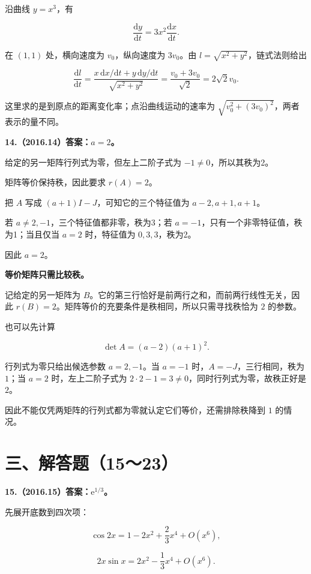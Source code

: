 \documentclass[UTF8,11pt,fontset=windows]{ctexart}
\begin{document}
沿曲线 $y=x^3$，有

$$
\frac{\mathrm dy}{\mathrm dt}=3x^2\frac{\mathrm dx}{\mathrm dt}.
$$

在 $(1,1)$ 处，横向速度为 $v_0$，纵向速度为 $3v_0$。由 $l=\sqrt{x^2+y^2}$，链式法则给出

$$
\frac{\mathrm dl}{\mathrm dt}
=\frac{x\,\mathrm dx/\mathrm dt+y\,\mathrm dy/\mathrm dt}{\sqrt{x^2+y^2}}
=\frac{v_0+3v_0}{\sqrt2}=2\sqrt2v_0.
$$

这里求的是到原点的距离变化率；点沿曲线运动的速率为 $\sqrt{v_0^2+(3v_0)^2}$，两者表示的量不同。

\clearpage

\textbf{14.（2016.14）答案：$a=2$。}

给定的另一矩阵行列式为零，但左上二阶子式为 $-1\ne0$，所以其秩为2。

矩阵等价保持秩，因此要求 $r(A)=2$。

把 $A$ 写成 $(a+1)I-J$，可知它的三个特征值为 $a-2,a+1,a+1$。

若 $a\ne2,-1$，三个特征值都非零，秩为3；若 $a=-1$，只有一个非零特征值，秩为1；当且仅当 $a=2$ 时，特征值为 $0,3,3$，秩为2。

因此 $a=2$。

\textbf{等价矩阵只需比较秩。}

记给定的另一矩阵为 $B$。它的第三行恰好是前两行之和，而前两行线性无关，因此 $r(B)=2$。矩阵等价的充要条件是秩相同，所以只需寻找秩恰为 $2$ 的参数。

也可以先计算

$$
\det A=(a-2)(a+1)^2.
$$

行列式为零只给出候选参数 $a=2,-1$。当 $a=-1$ 时，$A=-J$，三行相同，秩为 $1$；当 $a=2$ 时，左上二阶子式为 $2\cdot2-1=3\ne0$，同时行列式为零，故秩正好是 $2$。

因此不能仅凭两矩阵的行列式都为零就认定它们等价，还需排除秩降到 $1$ 的情况。

\clearpage

\section*{三、解答题（15～23）}

\textbf{15.（2016.15）答案：$\mathrm e^{1/3}$。}

先展开底数到四次项：

$$
\cos2x=1-2x^2+\frac23x^4+O(x^6),
$$

$$
2x\sin x=2x^2-\frac13x^4+O(x^6).
$$
\end{document}
